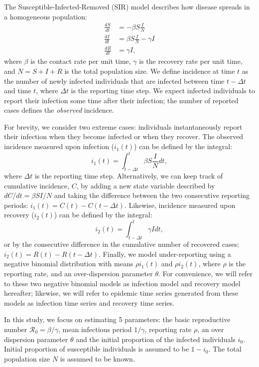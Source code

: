 \documentclass{article}\usepackage[]{graphicx}\usepackage[]{color}
\begin{document}
The Susceptible-Infected-Removed (SIR) model describes how disease spreads in a
homogeneous population:
\begin{equation}
\begin{aligned}
\frac{dS}{dt} &= - \beta S \frac{I}{N}\\
\frac{dI}{dt} &= \beta S \frac{I}{N} - \gamma I\\
\frac{dR}{dt} &= \gamma I,
\end{aligned}
\end{equation}
where $\beta$ is the contact rate per unit time, $\gamma$ is the recovery rate per unit time, 
and $N = S + I + R$ is the total population size. 
We define incidence at time $t$ as the number of newly infected
individuals that are infected between time $t- \Delta t$ and time $t$, where $\Delta t$ is
the reporting time step. We expect infected individuals to report their infection some time
after their infection; the number of reported cases defines the \emph{observed} incidence. 

For brevity, we consider two extreme cases: individuals instantaneously report
their infection when they become infected or when they recover. The observed incidence 
measured upon infection ($i_1(t)$) can be defined by the integral:
\begin{equation}
i_1(t) = \int_{t - \Delta t}^{t} \beta S \frac{I}{N} dt,
\end{equation}
where $\Delta t$ is the reporting time step.
Alternatively, we can keep track of cumulative incidence, $C$, by adding a 
new state variable described by $dC/dt = \beta S I/N$ and taking the difference between 
the two consecutive reporting periods: $i_1(t) = C(t) - C(t-\Delta t)$. Likewise, 
incidence measured upon recovery ($i_2(t)$) can be defined by the integral:
\begin{equation}
i_2(t) = \int_{t-\Delta t}^{t} \gamma I dt,
\end{equation}
or by the consecutive difference in the cumulative number of recovered cases:
$i_2(t) = R(t) - R(t - \Delta t)$.
Finally, we model under-reporting using a negative binomial distribution with
means $\rho i_1(t)$ and $\rho i_2(t)$, where $\rho$ is the reporting rate, and
an over-dispersion parameter $\theta$. For convenience, we will refer to these two
negative binomial models as infection model and recovery model hereafter; 
likewise, we will refer to epidemic time series generated from these models 
as infection time series and recovery time series.

In this study, we focus on estimating 5 parameters: the basic reproductive
number $\mathcal R_0 = \beta/\gamma$, mean infectious period $1/\gamma$, 
reporting rate $\rho$, an over dispersion parameter $\theta$ and the initial
proportion of the infected individuals $i_0$. Initial proportion of
susceptible individuals is assumed to be $1 - i_0$. The total population
size $N$ is assumed to be known.
\end{document}
